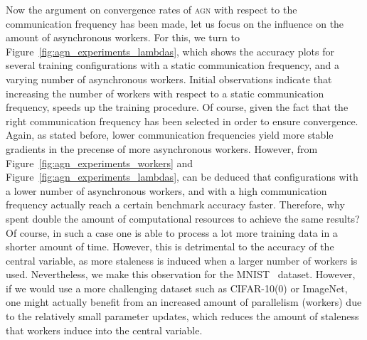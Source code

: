 Now the argument on convergence rates of \textsc{agn} with respect to the communication frequency has been made, let us focus on the influence on the amount of asynchronous workers. For this, we turn to Figure~\ref{fig:agn_experiments_lambdas}, which shows the accuracy plots for several training configurations with a static communication frequency, and a varying number of asynchronous workers. Initial observations indicate that increasing the number of workers with respect to a static communication frequency, speeds up the training procedure. Of course, given the fact that the right communication frequency has been selected in order to ensure convergence. Again, as stated before, lower communication frequencies yield more stable gradients in the precense of more asynchronous workers. However, from Figure~\ref{fig:agn_experiments_workers} and Figure~\ref{fig:agn_experiments_lambdas}, can be deduced that configurations with a lower number of asynchronous workers, and with a high communication frequency actually reach a certain benchmark accuracy faster. Therefore, why spent double the amount of computational resources to achieve the same results?\\

Of course, in such a case one is able to process a lot more training data in a shorter amount of time. However, this is detrimental to the accuracy of the central variable, as more staleness is induced when a larger number of workers is used. Nevertheless, we make this observation for the MNIST~\cite{mnist} dataset. However, if we would use a more challenging dataset such as CIFAR-10(0) or ImageNet, one might actually benefit from an increased amount of parallelism (workers) due to the relatively small parameter updates, which reduces the amount of staleness that workers induce into the central variable.\\

